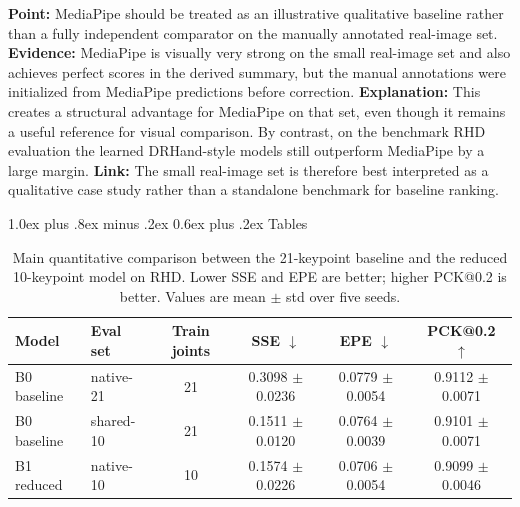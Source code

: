 \documentclass[10pt,letterpaper]{article}
\makeatletter
\renewcommand\subsection{\@startsection{subsection}{2}{\z@}%
  {1.0ex plus .8ex minus .2ex}%
  {0.6ex plus .2ex}%
  {\normalfont\itshape}}
\makeatother
\begin{document}
\medskip
\noindent\textbf{Point:} MediaPipe should be treated as an illustrative qualitative baseline rather than a fully independent comparator on the manually annotated real-image set.
\textbf{Evidence:} MediaPipe is visually very strong on the small real-image set and also achieves perfect scores in the derived summary, but the manual annotations were initialized from MediaPipe predictions before correction.
\textbf{Explanation:} This creates a structural advantage for MediaPipe on that set, even though it remains a useful reference for visual comparison. By contrast, on the benchmark RHD evaluation the learned DRHand-style models still outperform MediaPipe by a large margin.
\textbf{Link:} The small real-image set is therefore best interpreted as a qualitative case study rather than a standalone benchmark for baseline ranking.

\subsection{Tables}

\begin{table}[H]
\centering
\footnotesize
\caption{Main quantitative comparison between the 21-keypoint baseline and the reduced 10-keypoint model on RHD. Lower SSE and EPE are better; higher PCK@0.2 is better. Values are mean $\pm$ std over five seeds.}
\label{tab:main_accuracy}
\begin{tabular}{llcccc}
\toprule
Model & Eval set & Train joints & SSE $\downarrow$ & EPE $\downarrow$ & PCK@0.2 $\uparrow$ \\
\midrule
B0 baseline & native-21 & 21 & 0.3098 $\pm$ 0.0236 & 0.0779 $\pm$ 0.0054 & 0.9112 $\pm$ 0.0071 \\
B0 baseline & shared-10 & 21 & 0.1511 $\pm$ 0.0120 & 0.0764 $\pm$ 0.0039 & 0.9101 $\pm$ 0.0071 \\
B1 reduced & native-10 & 10 & 0.1574 $\pm$ 0.0226 & 0.0706 $\pm$ 0.0054 & 0.9099 $\pm$ 0.0046 \\
\bottomrule
\end{tabular}
\end{table}
\end{document}
